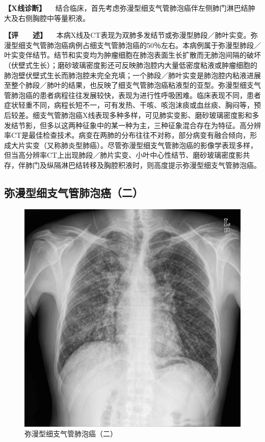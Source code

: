 \textbf{【X线诊断】}
　结合临床，首先考虑弥漫型细支气管肺泡癌伴左侧肺门淋巴结肿大及右侧胸腔中等量积液。

\textbf{【评　　述】}
　本病X线及CT表现为双肺多发结节或弥漫型肺段／肺叶实变。弥漫型细支气管肺泡癌病例占细支气管肺泡癌的50％左右。本病例属于弥漫型肺段／叶实变伴结节。结节和实变均为肿瘤细胞在肺泡表面生长扩散而无肺泡间隔的破坏（伏壁式生长）；磨砂玻璃密度影还可反映肺泡腔内大量低密度粘液或肿瘤细胞的肺泡壁伏壁式生长而肺泡腔未完全充填；一个肺段／肺叶实变是肺泡腔内粘液进展至整个肺段／肺叶的结果，也反映了细支气管肺泡癌粘液型的亚型。弥漫型细支气管肺泡癌的患者病程往往发展较快，表现为进行性呼吸困难。临床表现不同，患者症状轻重不同，病程长短不一，可有发热、干咳、咳泡沫痰或血丝痰、胸闷等，预后较差。细支气管肺泡癌X线表现多种多样，可见肺实变影、磨砂玻璃密度影和多发结节影，但多以这两种征象中的某一种为主，三种征象混合存在为特征。高分辨率CT是最佳检查技术。病变在两肺的分布往往不对称，部分病变有融合倾向，形成大片实变（又称肺炎型肺癌）。尽管弥漫型细支气管肺泡癌的影像学表现多样，但当高分辨率CT上出现肺段／肺片实变、小叶中心性结节、磨砂玻璃密度影共存，伴肺门及纵隔淋巴结转移及胸腔积液时，则高度提示弥漫型细支气管肺泡癌。

\subsection{弥漫型细支气管肺泡癌（二）}

\begin{figure}[!htbp]
 \centering
 \includegraphics{./images/Image00170.jpg}
 \captionsetup{justification=centering}
 \caption{弥漫型细支气管肺泡癌（二）}
 \label{fig3-8-8}
  \end{figure} 

